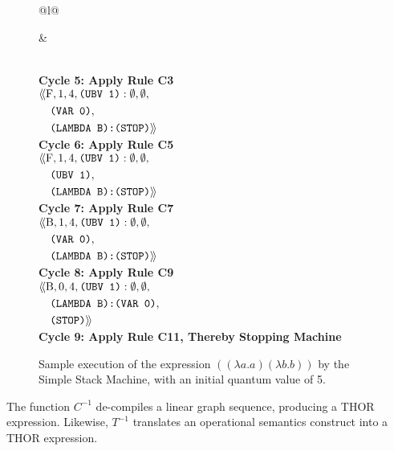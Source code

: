 \begin{figure}[p]
{\begin{tabular}{@{}l@{}}
\begin{aligned}
&\quad{}\ssmright
\end{aligned}\)\\\noalign{\vskip 3.5pt}
\textbf{Cycle 5: Apply Rule C3}\\
\(\begin{aligned}
&\langle\!\langle\mathrm{F},1,4,\texttt{(UBV 1)}:\emptyset,\emptyset,\\
&\quad\texttt{(VAR 0)},\\
&\quad\texttt{(LAMBDA B):(STOP)}\rangle\!\rangle
\end{aligned}\)\\\noalign{\vskip 3.5pt}
\textbf{Cycle 6: Apply Rule C5}\\
\(\begin{aligned}
&\langle\!\langle\mathrm{F},1,4,\texttt{(UBV 1)}:\emptyset,\emptyset,\\
&\quad\texttt{(UBV 1)},\\
&\quad\texttt{(LAMBDA B):(STOP)}\rangle\!\rangle
\end{aligned}\)\\\noalign{\vskip 3.5pt}
\textbf{Cycle 7: Apply Rule C7}\\
\(\begin{aligned}
&\langle\!\langle\mathrm{B},1,4,\texttt{(UBV 1)}:\emptyset,\emptyset,\\
&\quad\texttt{(VAR 0)},\\
&\quad\texttt{(LAMBDA B):(STOP)}\rangle\!\rangle
\end{aligned}\)\\\noalign{\vskip 3.5pt}
\textbf{Cycle 8: Apply Rule C9}\\
\(\begin{aligned}
&\langle\!\langle\mathrm{B},0,4,\texttt{(UBV 1)}:\emptyset,\emptyset,\\
&\quad\texttt{(LAMBDA B):(VAR 0)},\\
&\quad\texttt{(STOP)}\rangle\!\rangle
\end{aligned}\)\\\noalign{\vskip 3.5pt}
\textbf{Cycle 9: Apply Rule C11, Thereby Stopping Machine}
\end{tabular}}
\normalsize
\caption[Sample execution of the Simple Stack Machine]{Sample execution of the expression \(((\lambda a.a)(\lambda b.b))\) by the Simple Stack Machine, with an initial quantum value of 5.}
\end{figure}


The function \(C^{-1}\) de-compiles a linear graph sequence, producing a THOR
expression. Likewise, \(T^{-1}\) translates an operational semantics construct
into a THOR expression.

